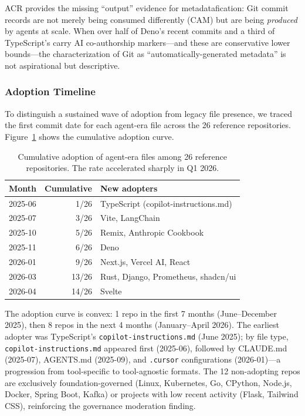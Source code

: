 \documentclass[sigconf, nonacm, anonymous=false]{acmart}
\begin{document}
ACR provides the missing ``output'' evidence for metadatafication: Git commit records are not merely being consumed differently (CAM) but are being \textit{produced} by agents at scale. When over half of Deno's recent commits and a third of TypeScript's carry AI co-authorship markers---and these are conservative lower bounds---the characterization of Git as ``automatically-generated metadata'' is not aspirational but descriptive.

\subsubsection{Adoption Timeline}

To distinguish a sustained wave of adoption from legacy file presence, we traced the first commit date for each agent-era file across the 26 reference repositories. Figure~\ref{tab:adoption} shows the cumulative adoption curve.

\begin{table}[ht]
\centering
\small
\begin{tabularx}{\textwidth}{lrl}
\toprule
\textbf{Month} & \textbf{Cumulative} & \textbf{New adopters} \\
\midrule
2025-06 & 1/26 & TypeScript (copilot-instructions.md) \\
2025-07 & 3/26 & Vite, LangChain \\
2025-10 & 5/26 & Remix, Anthropic Cookbook \\
2025-11 & 6/26 & Deno \\
2026-01 & 9/26 & Next.js, Vercel AI, React \\
2026-03 & 13/26 & Rust, Django, Prometheus, shadcn/ui \\
2026-04 & 14/26 & Svelte \\
\bottomrule
\end{tabularx}
\caption{Cumulative adoption of agent-era files among 26 reference repositories. The rate accelerated sharply in Q1 2026.}
\label{tab:adoption}
\end{table}

The adoption curve is convex: 1 repo in the first 7 months (June--December 2025), then 8 repos in the next 4 months (January--April 2026). The earliest adopter was TypeScript's \texttt{copilot-instructions.md} (June 2025); by file type, \texttt{copilot-instructions.md} appeared first (2025-06), followed by CLAUDE.md (2025-07), AGENTS.md (2025-09), and \texttt{.cursor} configurations (2026-01)---a progression from tool-specific to tool-agnostic formats. The 12 non-adopting repos are exclusively foundation-governed (Linux, Kubernetes, Go, CPython, Node.js, Docker, Spring Boot, Kafka) or projects with low recent activity (Flask, Tailwind CSS), reinforcing the governance moderation finding.
\end{document}
